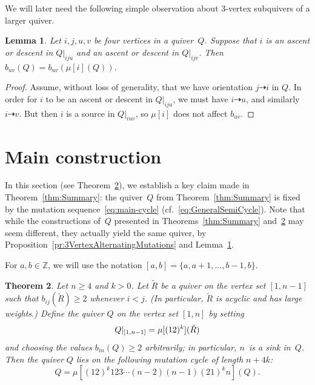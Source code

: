 \documentclass[11pt, letterpaper]{amsart}
\newtheorem{theorem}{Theorem}[section]
\newtheorem{lemma}[theorem]{Lemma}
\theoremstyle{definition}
\numberwithin{equation}{section}
\def\ZZ{{\mathbb Z}}
\newcommand{\T}[2]{\mu[#1](#2)} %
\newcommand{\points}{\!\dasharrow\!}
\begin{document}
We will later need the following simple observation about 3-vertex subquivers of a larger quiver. 

\begin{lemma}
\label{lem:4VertexWeightChanges}
Let $i,j,u,v$ be four vertices in a quiver~$Q$. 
Suppose that $i$ is an ascent or descent in $Q|_{iju}$ and an ascent or descent in $Q|_{ijv}$.
Then $b_{uv}(Q) = b_{uv}(\T{i}{Q})$.
\end{lemma}

\begin{proof}
Assume, without loss of generality, that we have orientation $j \points i$ in $Q$. 
In order for $i$ to be an ascent or descent in $Q|_{iju}$, 
we must have $i \points u$, and similarly~$i \points v$. 
But then $i$ is a source in $Q|_{iuv}$, so $\mu[i]$ does not affect $b_{uv}$.
\end{proof}

\newpage

\section{Main construction}
\label{Sec:GeneralSemiCycles}

In this section (see Theorem~\ref{thm:GeneralSemiCycles}), 
we establish a key claim made in Theorem~\ref{thm:Summary}: 
the quiver~$Q$ from Theorem~\ref{thm:Summary} 
is fixed by the mutation sequence~\eqref{eq:main-cycle} (cf.~\eqref{eq:GeneralSemiCycle}).
Note that while the constructions of~$Q$ presented in Theorems~\ref{thm:Summary} and~\ref{thm:GeneralSemiCycles} 
may seem different, they actually yield the same quiver, 
by Proposition~\ref{pr:3VertexAlternatingMutations} and Lemma~\ref{lem:4VertexWeightChanges}.

For $a,b\in\ZZ$, we will use the notation $[a,b]=\{a,a+1,\dots,b-1,b\}$. 

\begin{theorem}
\label{thm:GeneralSemiCycles}
Let $n\ge 4$ and $k> 0$.
Let $\tilde R$ be a quiver on the vertex set $[1,n-1]$ 
such that $b_{ij}(\tilde R)\ge 2$ %
whenever $i<j$. 
(In particular, $\tilde R$ is acyclic and has large weights.) 
Define the quiver $Q$ on the vertex set $[1,n]$ 
by setting 
\begin{equation}
\label{eq:Q{[1,n]}}
Q|_{[1,n-1]}= \T{(12)^k}{\tilde R}
\end{equation}
and choosing the values $b_{in}(Q) \geq 2$ arbitrarily; 
in particular, $n$~is a sink in~$Q$.  
Then the quiver $Q$ lies on the following mutation cycle of length $n+4k$:
\begin{equation}
\label{eq:GeneralSemiCycle}
    Q = \T{(1 2)^k 1 2 3 \cdots (n-2) (n-1) (2 1)^k n}{Q}.
\end{equation}
\end{theorem}
\end{document}
